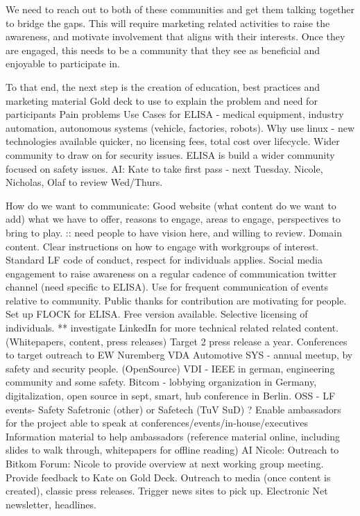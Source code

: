 \documentclass[12pt]{ElisaPaper}
\begin{document}
We need to reach out to both of these communities and get them talking together to bridge the gaps.
This will require marketing related activities to raise the awareness, and motivate involvement that aligns with their interests.
Once they are engaged, this needs to be a community that they see as beneficial and enjoyable to participate in. 

To that end, the next step is the creation of education, best practices and marketing material
Gold deck to use to explain the problem and need for participants
Pain problems
Use Cases for ELISA - medical equipment, industry automation,  autonomous systems (vehicle, factories, robots).   
Why use linux - new technologies available quicker,  no licensing fees, total cost over lifecycle.
Wider community to draw on for security issues.
ELISA is build a wider community focused on safety issues.
AI:  Kate to take first pass - next Tuesday.
Nicole, Nicholas, Olaf to review Wed/Thurs.  

How do we want to communicate:
Good website (what content do we want to add)
what we have to offer,  reasons to engage, areas to engage,  perspectives to bring to play. :: need people to have vision here, and willing to review.
Domain content.
Clear instructions on how to engage with workgroups of interest.
Standard LF code of conduct,  respect for individuals applies.
Social media engagement to raise awareness 
on a regular cadence of communication twitter channel (need specific to ELISA).
Use for frequent communication of events relative to community.
Public thanks for contribution are motivating for people.   
Set up FLOCK for ELISA.
Free version available.
Selective licensing of individuals.
** investigate
LinkedIn for more technical related related content.
(Whitepapers, content, press releases)
Target 2 press release a year.
Conferences to target outreach to 
EW Nuremberg
VDA Automotive SYS - annual meetup, by safety and security people.  (OpenSource)
VDI - IEEE in german,  engineering community and some safety.
Bitcom - lobbying organization in Germany,  digitalization,  open source in sept,  smart,  hub conference in Berlin. 
OSS - LF events- Safety
Safetronic (other) or Safetech (TuV SuD)
?
Enable ambassadors for the project able to speak at conferences/events/in-house/executives 
Information material to help ambassadors (reference material online, including slides to walk through, whitepapers for offline reading)
AI Nicole: Outreach to Bitkom Forum:  Nicole to provide overview at next working group meeting.
Provide feedback to Kate on Gold Deck.
Outreach to media (once content is created),  classic press releases.
Trigger news sites to pick up.
Electronic Net newsletter,  headlines.
\end{document}
